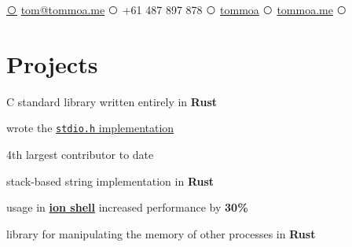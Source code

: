 \documentclass[a4paper]{style}
\def\ci#1{\textcircled{\resizebox{.5em}{!}{#1}}}
\begin{document}
{
\href{mailto:tom@tommoa.me}{\ci{\faEnvelope}} {\fontsize{10}{10}\selectfont \href{mailto:tom@tommoa.me}{tom@tommoa.me}}}
{
\ci{\faPhone}  {\fontsize{10}{10}\selectfont +61 487 897 878} 
}
{
\href{https://github.com/tommoa}{\ci{\faGithub}} {\fontsize{10}{10}\selectfont \href{https://github.com/tommoa}{tommoa}}
}
{
\href{https://tommoa.me/}{\ci{\faFirefox}} {\fontsize{10}{10}\selectfont \href{https://tommoa.me/}{tommoa.me}}
}
{
\href{https://www.linkedin.com/in/tom-almeida-260866165/}{\ci{\faLinkedin}}
}


\begin{minipage}[t]{0.5\textwidth} %



\section{Projects}
    \vspace{7pt}
    \begin{tightitemize}
        \item C standard library written entirely in \textbf{Rust}
        \item wrote the \href{https://github.com/redox-os/relibc/pull/85}{\texttt{stdio.h} implementation}
        \item 4th largest contributor to date
    \end{tightitemize}
    \vspace{-1pt}
    \begin{tightitemize}
        \item stack-based string implementation in \textbf{Rust}
        \item usage in \href{https://gitlab.redox-os.org/redox-os/ion}{\textbf{ion shell}} increased performance by \textbf{30\%}
    \end{tightitemize}
    \vspace{-1pt}
    \begin{tightitemize}
        \item library for manipulating the memory of other processes in \textbf{Rust}
    \end{tightitemize}


\end{minipage}
\end{document}
